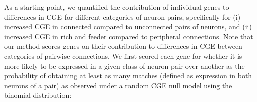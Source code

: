 \documentclass[10pt,letterpaper]{article}
\begin{document}
As a starting point, we quantified the contribution of individual genes to differences in CGE for different categories of neuron pairs, specifically for (i) increased CGE in connected compared to unconnected pairs of neurons, and (ii) increased CGE in rich and feeder compared to peripheral connections.
\color{teal}
Note that our method scores genes on their contribution to differences in CGE between categories of pairwise connections.
\color{black}
We first scored each gene for whether it is more likely to be expressed in a given class of neuron pair over another as the probability of obtaining at least as many matches (defined as expression in both neurons of a pair) as observed under a random CGE null model using the binomial distribution:
\end{document}
